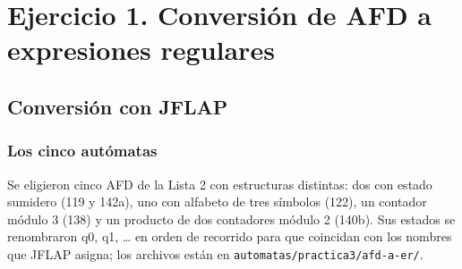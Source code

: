 \hypertarget{ejercicio-1.-conversiuxf3n-de-afd-a-expresiones-regulares}{%
\section{Ejercicio 1. Conversión de AFD a expresiones regulares}\label{ejercicio-1.-conversiuxf3n-de-afd-a-expresiones-regulares}}

\hypertarget{conversiuxf3n-con-jflap}{%
\subsection{Conversión con JFLAP}\label{conversiuxf3n-con-jflap}}

\hypertarget{los-cinco-autuxf3matas}{%
\subsubsection{Los cinco autómatas}\label{los-cinco-autuxf3matas}}

Se eligieron cinco AFD de la Lista 2 con estructuras distintas: dos con estado sumidero (119 y 142a), uno con alfabeto de tres símbolos (122), un contador módulo 3 (138) y un producto de dos contadores módulo 2 (140b). Sus estados se renombraron q0, q1, \ldots{} en orden de recorrido para que coincidan con los nombres que JFLAP asigna; los archivos están en \texttt{automatas/practica3/afd-a-er/}.

